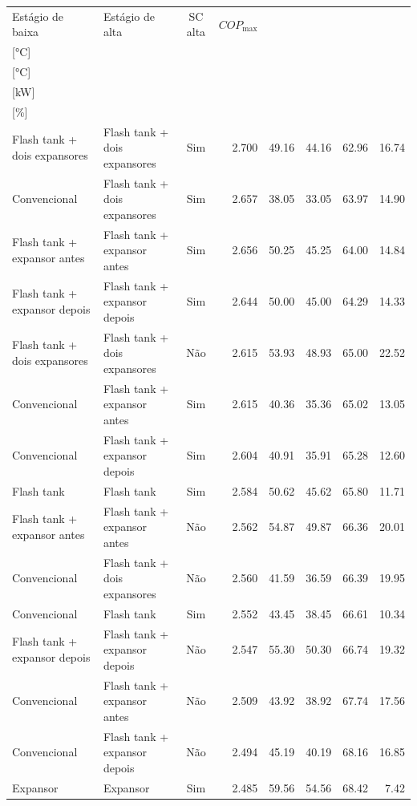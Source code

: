 {\small\setlength{\tabcolsep}{4pt}\renewcommand{\arraystretch}{1.12}
\begin{tabular}{llcrrrrr}
\toprule
Estágio de baixa & Estágio de alta & SC alta & $COP_{\max}$ & \shortstack{$T_{\mathrm{cond,l}}^*$\\{[°C]}} & \shortstack{$T_{\mathrm{evap,h}}^*$\\{[°C]}} & \shortstack{$\dot W_{\mathrm{liq}}$\\{[kW]}} & \shortstack{$\Delta COP_{\mathrm{opt}}$\\{[\%]}} \\
\midrule
Flash tank + dois expansores & Flash tank + dois expansores & Sim & 2.700 & 49.16 & 44.16 & 62.96 & 16.74 \\
Convencional & Flash tank + dois expansores & Sim & 2.657 & 38.05 & 33.05 & 63.97 & 14.90 \\
Flash tank + expansor antes & Flash tank + expansor antes & Sim & 2.656 & 50.25 & 45.25 & 64.00 & 14.84 \\
Flash tank + expansor depois & Flash tank + expansor depois & Sim & 2.644 & 50.00 & 45.00 & 64.29 & 14.33 \\
Flash tank + dois expansores & Flash tank + dois expansores & Não & 2.615 & 53.93 & 48.93 & 65.00 & 22.52 \\
Convencional & Flash tank + expansor antes & Sim & 2.615 & 40.36 & 35.36 & 65.02 & 13.05 \\
Convencional & Flash tank + expansor depois & Sim & 2.604 & 40.91 & 35.91 & 65.28 & 12.60 \\
Flash tank & Flash tank & Sim & 2.584 & 50.62 & 45.62 & 65.80 & 11.71 \\
Flash tank + expansor antes & Flash tank + expansor antes & Não & 2.562 & 54.87 & 49.87 & 66.36 & 20.01 \\
Convencional & Flash tank + dois expansores & Não & 2.560 & 41.59 & 36.59 & 66.39 & 19.95 \\
Convencional & Flash tank & Sim & 2.552 & 43.45 & 38.45 & 66.61 & 10.34 \\
Flash tank + expansor depois & Flash tank + expansor depois & Não & 2.547 & 55.30 & 50.30 & 66.74 & 19.32 \\
Convencional & Flash tank + expansor antes & Não & 2.509 & 43.92 & 38.92 & 67.74 & 17.56 \\
Convencional & Flash tank + expansor depois & Não & 2.494 & 45.19 & 40.19 & 68.16 & 16.85 \\
Expansor & Expansor & Sim & 2.485 & 59.56 & 54.56 & 68.42 & 7.42 \\

\end{tabular}}
